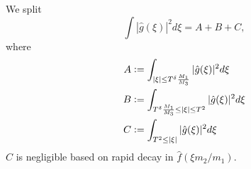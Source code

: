 We split \[
\int |\hat{g}(\xi)|^2 d\xi = A+B+C, 
\]
where
\begin{align*}
    A&\mathrel{\mathop:}= \int_{|\xi|\leq T^\delta \frac{M_1}{M_3}}     |\hat{g}(\xi)|^2 d\xi\\
    B&\mathrel{\mathop:}= \int_{T^\delta \frac{M_1}{M_3}\leq|\xi|\leq T^2}     |\hat{g}(\xi)|^2 d\xi\\
    C&\mathrel{\mathop:}= \int_{T^2\leq |\xi|}     |\hat{g}(\xi)|^2 d\xi\\
\end{align*}
$C$ is negligible based on rapid decay in $\hat{f}(\xi m_2/m_1)$.